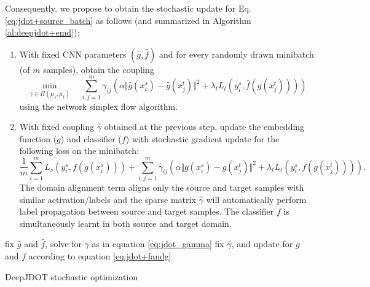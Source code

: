 \documentclass[runningheads]{llncs}
\begin{document}
Consequently, we propose to obtain the stochastic update for Eq.\eqref{eq:jdot+source_batch}
as follows (and summarized in Algorithm \ref{al:deepjdot+emd}):
\begin{enumerate}
    \item With fixed CNN parameters $(\hat{g},\hat{f})$ and for every randomly drawn minibatch (of $m$ samples), obtain the coupling
    \begin{equation}
     \min_{\gamma\in \Pi(\mu_s,\mu_t)}\quad\sum_{i,j=1}^{m} \gamma_{ij} \left(\alpha \Vert \hat{g}(x_i^s) - \hat{g}(x_j^t) \Vert^2 + \lambda_t  L_t\left(y_i^s,\hat{f}(g(x_j^t))\right) \right) 
     \label{eq:jdot_gamma}
     \end{equation}
    using the network simplex flow algorithm. 
    \item With fixed coupling $\hat{\gamma}$ obtained at the previous step, update the embedding function ($g$) and classifier ($f$) with stochastic gradient update for the following loss on the minibatch:
    \begin{equation}
      \frac{1}{m}\sum_{i=1}^{m} L_s\left(y_i^s, f(g(x_i^s))\right) + \sum_{i,j=1}^{m} \hat{\gamma}_{ij} \left(\alpha \Vert g(x_i^s) - g(x_j^t) \Vert^2 + \lambda_t  L_t\left(y_i^s,f(g(x_j^t))\right) \right).
    \label{eq:jdot+fandg}
    \end{equation}
The domain alignment term aligns only the source and target samples with similar activation/labels and the sparse matrix $\hat{\gamma}$ will automatically perform label propagation between source and target samples. The classifier $f$ is simultaneously learnt in both source and target domain.
\end{enumerate}


\begin{algorithm}[!t]
  \begin{algorithmic}[1]
   \State fix $\hat{g}$ and $\hat{f}$, solve for $\gamma$ as in {equation} \eqref{eq:jdot_gamma}
   \State fix $\hat{\gamma}$, and update for $g$ and $f$ according to {equation} \eqref{eq:jdot+fandg}   	
    \EndFor
    \label{al:deepjdot+emd}
  \end{algorithmic}
  \caption{DeepJDOT stochastic optimization}
\end{algorithm} 

 
\end{document}
